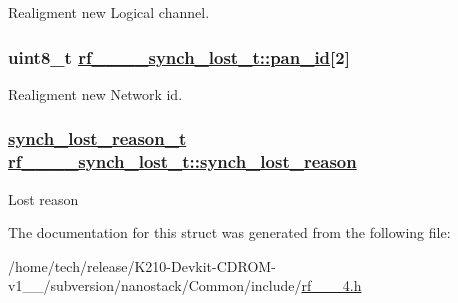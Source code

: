 Realigment new Logical channel. \hypertarget{structrf__802__15__4__synch__lost__t_ed60608d32963aac8f9609578be68f8b}{
\subsubsection[pan\_\-id]{\setlength{\rightskip}{0pt plus 5cm}uint8\_\-t \hyperlink{structrf__802__15__4__synch__lost__t_ed60608d32963aac8f9609578be68f8b}{rf\_\_\_\_\-synch\_\-lost\_\-t::pan\_\-id}\mbox{[}2\mbox{]}}}
\label{structrf__802__15__4__synch__lost__t_ed60608d32963aac8f9609578be68f8b}


Realigment new Network id. \hypertarget{structrf__802__15__4__synch__lost__t_5ee82a6d8ff2eb566f6aa375d38ea1ff}{
\subsubsection[synch\_\-lost\_\-reason]{\setlength{\rightskip}{0pt plus 5cm}\hyperlink{rf__802__15__4_8h_b7a607c44af208866c5d708fd7729b62}{synch\_\-lost\_\-reason\_\-t} \hyperlink{structrf__802__15__4__synch__lost__t_5ee82a6d8ff2eb566f6aa375d38ea1ff}{rf\_\_\_\_\-synch\_\-lost\_\-t::synch\_\-lost\_\-reason}}}
\label{structrf__802__15__4__synch__lost__t_5ee82a6d8ff2eb566f6aa375d38ea1ff}


Lost reason 

The documentation for this struct was generated from the following file:\begin{CompactItemize}
\item 
/home/tech/release/K210-Devkit-CDROM-v1\_\_/subversion/nanostack/Common/include/\hyperlink{rf__802__15__4_8h}{rf\_\_\_\-4.h}\end{CompactItemize}
